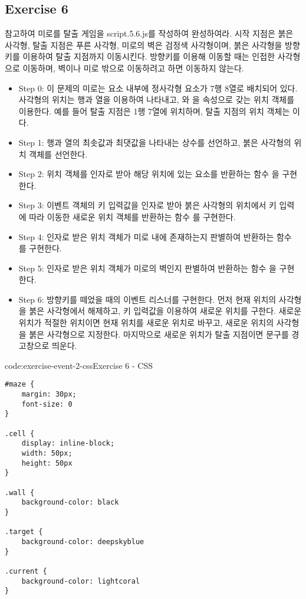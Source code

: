 \subsection*{Exercise 6}

\와 \를 참고하여 미로를 탈출 게임을 script.5.6.js를 작성하여 완성하여라. 시작 지점은 붉은 사각형, 탈출 지점은 푸른 사각형, 미로의 벽은 검정색 사각형이며, 붉은 사각형을 방향키를 이용하여 탈출 지점까지 이동시킨다. 방향키를 이용해 이동할 때는 인접한 사각형으로 이동하며, 벽이나 미로 밖으로 이동하려고 하면 이동하지 않는다.

\begin{itemize}
    \item Step 0: 이 문제의 미로는  요소 내부에 정사각형 요소가 7행 8열로 배치되어 있다. 사각형의 위치는 행과 열을 이용하여 나타내고, 와 을 속성으로 갖는 위치 객체를 이용한다. 예를 들어 탈출 지점은 1행 7열에 위치하며, 탈출 지점의 위치 객체는 이다.
    \item Step 1: 행과 열의 최솟값과 최댓값을 나타내는 상수를 선언하고, 붉은 사각형의 위치 객체를 선언한다.
    \item Step 2: 위치 객체를 인자로 받아 해당 위치에 있는 요소를 반환하는 함수 을 구현한다.
    \item Step 3: 이벤트 객체의 키 입력값을 인자로 받아 붉은 사각형의 위치에서 키 입력에 따라 이동한 새로운 위치 객체를 반환하는 함수 를 구현한다.
    \item Step 4: 인자로 받은 위치 객체가 미로 내에 존재하는지 판별하여 반환하는 함수 를 구현한다.
    \item Step 5: 인자로 받은 위치 객체가 미로의 벽인지 판별하여 반환하는 함수 을 구현한다.
    \item Step 6: 방향키를 떼었을 때의 이벤트 리스너를 구현한다. 먼저 현재 위치의 사각형을 붉은 사각형에서 해제하고, 키 입력값을 이용하여 새로운 위치를 구한다. 새로운 위치가 적절한 위치이면 현재 위치를 새로운 위치로 바꾸고, 새로운 위치의 사각형을 붉은 사각형으로 지정한다. 마지막으로 새로운 위치가 탈출 지점이면  문구를 경고창으로 띄운다.
\end{itemize}

\begin{codeenv}{code:exercise-event-2-css}{Exercise 6 - CSS}\begin{verbatim}
#maze {
    margin: 30px;
    font-size: 0
}

.cell {
    display: inline-block;
    width: 50px;
    height: 50px
}

.wall {
    background-color: black
}

.target {
    background-color: deepskyblue
}

.current {
    background-color: lightcoral
}
\end{verbatim}
\end{codeenv}

